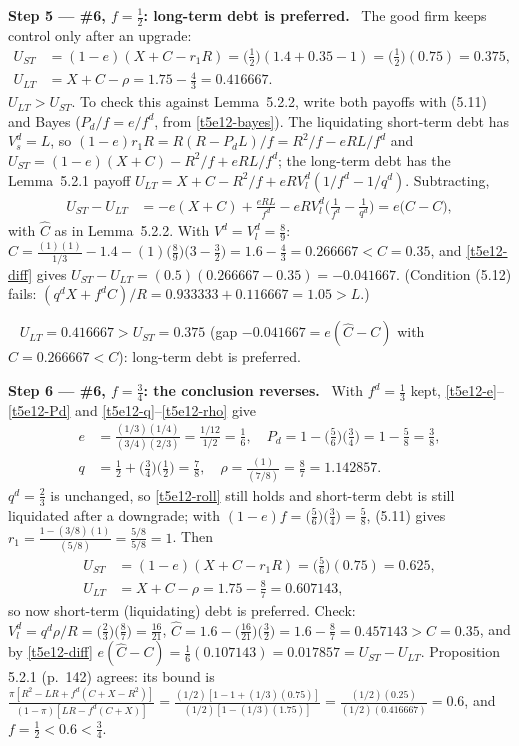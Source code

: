 \documentclass[11pt,a4paper]{article}
\newcommand{\step}[2]{\par\medskip\noindent\textbf{Step #1 --- #2.}~}
\newcommand{\answer}[1]{\par\smallskip\noindent\fbox{\textbf{Answer #1.}}~}
\begin{document}
\step{5}{\#6, $f=\frac12$: long-term debt is preferred} The good firm keeps control only after an upgrade:
\begin{align}
  U_{ST} &= (1-e)(X+C-r_1R) = \big(\tfrac12\big)(1.4+0.35-1) = \big(\tfrac12\big)(0.75) = 0.375, \label{t5e12-UST1}\\
  U_{LT} &= X+C-\rho = 1.75-\tfrac43 = 0.416667. \label{t5e12-ULT1}
\end{align}
$U_{LT}>U_{ST}$. To check this against Lemma~5.2.2, write both payoffs with (5.11) and Bayes
($P_d/f=e/f^d$, from \eqref{t5e12-bayes}). The liquidating short-term debt has $V_s^d=L$, so
$(1-e)r_1R=R(R-P_dL)/f=R^2/f-eRL/f^d$ and
$U_{ST}=(1-e)(X+C)-R^2/f+eRL/f^d$; the long-term debt has the Lemma~5.2.1 payoff
$U_{LT}=X+C-R^2/f+eRV_l^d(1/f^d-1/q^d)$. Subtracting,
\begin{align}
  U_{ST}-U_{LT} &= -e(X+C)+\frac{eRL}{f^d}-eRV_l^d\Big(\frac1{f^d}-\frac1{q^d}\Big)
  = e\big(\widehat C-C\big), \label{t5e12-diff}
\end{align}
with $\widehat C$ as in Lemma~5.2.2. With $V^d=V_l^d=\frac89$:
$\widehat C=\frac{(1)(1)}{1/3}-1.4-(1)\big(\tfrac89\big)\big(3-\tfrac32\big)=1.6-\tfrac43=0.266667<C=0.35$, and \eqref{t5e12-diff} gives
$U_{ST}-U_{LT}=(0.5)(0.266667-0.35)=-0.041667$. (Condition (5.12) fails: $(q^dX+f^dC)/R=0.933333+0.116667=1.05>L$.)

\answer{(ii)} $U_{LT}=0.416667>U_{ST}=0.375$ (gap $-0.041667=e(\widehat C-C)$ with $\widehat C=0.266667<C$):
long-term debt is preferred.

\step{6}{\#6, $f=\frac34$: the conclusion reverses} With $f^d=\frac13$ kept, \eqref{t5e12-e}--\eqref{t5e12-Pd} and \eqref{t5e12-q}--\eqref{t5e12-rho} give
\begin{align}
  e &= \frac{(1/3)(1/4)}{(3/4)(2/3)} = \frac{1/12}{1/2} = \frac16, \quad P_d = 1-\big(\tfrac56\big)\big(\tfrac34\big)=1-\tfrac58=\tfrac38, \nonumber\\
  q &= \tfrac12+\big(\tfrac34\big)\big(\tfrac12\big)=\tfrac78, \quad \rho=\frac{(1)}{(7/8)}=\tfrac87=1.142857. \nonumber
\end{align}
$q^d=\frac23$ is unchanged, so \eqref{t5e12-roll} still holds and short-term debt is still liquidated after a downgrade;
with $(1-e)f=\big(\tfrac56\big)\big(\tfrac34\big)=\tfrac58$, (5.11) gives $r_1=\frac{1-(3/8)(1)}{(5/8)}=\frac{5/8}{5/8}=1$. Then
\begin{align}
  U_{ST} &= (1-e)(X+C-r_1R) = \big(\tfrac56\big)(0.75) = 0.625, \label{t5e12-UST2}\\
  U_{LT} &= X+C-\rho = 1.75-\tfrac87 = 0.607143, \label{t5e12-ULT2}
\end{align}
so now short-term (liquidating) debt is preferred. Check: $V_l^d=q^d\rho/R=\big(\tfrac23\big)\big(\tfrac87\big)=\frac{16}{21}$,
$\widehat C=1.6-\big(\tfrac{16}{21}\big)\big(\tfrac32\big)=1.6-\tfrac87=0.457143>C=0.35$, and by \eqref{t5e12-diff}
$e(\widehat C-C)=\frac16(0.107143)=0.017857=U_{ST}-U_{LT}$.
Proposition 5.2.1 (p.~142) agrees: its bound is
$\frac{\pi[R^2-LR+f^d(C+X-R^2)]}{(1-\pi)[LR-f^d(C+X)]}=\frac{(1/2)[1-1+(1/3)(0.75)]}{(1/2)[1-(1/3)(1.75)]}=\frac{(1/2)(0.25)}{(1/2)(0.416667)}=0.6$, and $f=\frac12<0.6<\frac34$.
\end{document}
